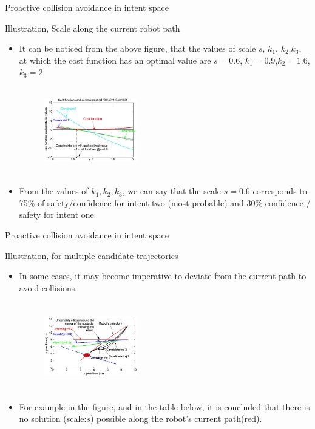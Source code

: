 \documentclass{beamer}
\begin{document}
\begin{frame}{Proactive collision avoidance in intent space}
\begin{block}{Illustration, Scale along the current robot path}
\begin{itemize}
\item{It can be noticed from the above figure, that the values of scale $s$, $k_1$, $k_2$,$k_3$, at which the cost function has an optimal value are $s=0.6$, $k_1=0.9$,$k_2=1.6$,$k_3=2$}
\begin{figure}
\includegraphics[width= 4.1cm, height=3.8cm]{fig12.eps}
\end{figure}
\item{From the values of $k_1,k_2,k_3$, we can say that the scale $s =0.6$ corresponds to 75\% of safety/confidence for intent two (most probable) and 30\% confidence / safety for intent one}
\end{itemize}

\end{block}
\end{frame}
\begin{frame}{Proactive collision avoidance in intent space}
\begin{block}{Illustration, for multiple candidate trajectories}
\begin{itemize}
\item{In some cases, it may become imperative to deviate from the current path to avoid collisions.}
\begin{figure}
\includegraphics[width= 4.1cm, height=3.8cm]{fig13.eps}
\end{figure}
\item{For example in the figure, and in the table below, it is concluded that there is no solution (scale:$s$) possible along the robot’s current path(red).}
\end{itemize}
\end{block}
\end{frame}
\end{document}
